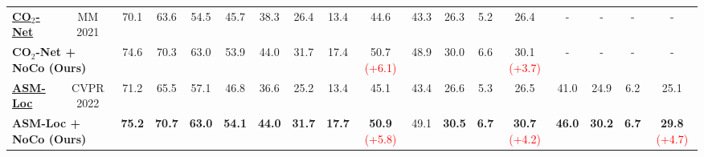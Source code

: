 \begin{table*}[htb]
{\begin{tabular}{lc|cccccccccccccccc}
\underline{\textbf{CO$_2$-Net \cite{hong2021cross}}} & \multicolumn{1}{c|}{MM 2021}& 70.1& 63.6& 54.5& 45.7& 38.3& 26.4& 13.4& \multicolumn{1}{c|}{44.6}& 43.3& 26.3& 5.2& \multicolumn{1}{c|}{26.4}& -& -& -& -             \\

\multicolumn{2}{l|}{\textbf{CO$_2$-Net + NoCo (Ours)} }& 74.6 & 70.3 & 63.0 & 53.9 & 44.0 & 31.7 & 17.4 & \multicolumn{1}{c|}{50.7 \textcolor{red}{(+6.1)}}& 48.9 & 30.0 & 6.6 & \multicolumn{1}{c|}{30.1 \textcolor{red}{(+3.7)}}& -& -& -& -             \\

\hdashline[5pt/1pt]

\underline{\textbf{ASM-Loc \cite{he2022asm}}} & \multicolumn{1}{c|}{CVPR 2022}& 71.2& 65.5& 57.1& 46.8& 36.6& 25.2& 13.4& \multicolumn{1}{c|}{45.1}& 43.4 & 26.6 & 5.3 & \multicolumn{1}{c|}{26.5}& 41.0& 24.9& 6.2& 25.1          \\

\multicolumn{2}{l|}{\textbf{ASM-Loc + NoCo (Ours)}}& \textbf{75.2}& \textbf{70.7}& \textbf{63.0}& \textbf{54.1}& \textbf{44.0}& \textbf{31.7}& \textbf{17.7}& \multicolumn{1}{c|}{\textbf{50.9} \textcolor{red}{(+5.8)}}& 49.1& \textbf{30.5}& \textbf{6.7}& \multicolumn{1}{c|}{\textbf{30.7} \textcolor{red}{(+4.2)}}& \textbf{46.0}& \textbf{30.2}& \textbf{6.7}& \textbf{29.8} \textcolor{red}{(+4.7)} \\ 
\hline
\end{tabular}





}
\label{baseline-on all}
\end{table*}